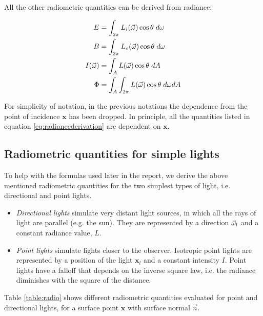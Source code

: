 All the other radiometric quantities can be derived from radiance:

\begin{equation}
\begin{split}
E &= \int_{2\pi} L_i(\vec{\omega}) \cos\theta \; d\omega \\
B &= \int_{2\pi} L_o(\vec{\omega}) \cos\theta \; d\omega \\
I(\vec{\omega}) &= \int_A L(\vec{\omega}) \cos\theta \; dA \\
\Phi &= \int_A \int_{2\pi} L(\vec{\omega}) \cos\theta \; d\omega dA
\end{split}
\label{eq:radiancederivation} 
\end{equation}

For simplicity of notation, in the previous notations the dependence from the point of incidence $\mathbf{x}$ has been dropped. In principle, all the quantities listed in equation \ref{eq:radiancederivation} are dependent on $\mathbf{x}$.

\subsection{Radiometric quantities for simple lights}

To help with the formulas used later in the report, we derive the above mentioned radiometric quantities for the two simplest types of light, i.e. directional and point lights.
\begin{itemize}
	\item \textit{Directional lights} simulate very distant light sources, in which all the rays of light are parallel (e.g. the sun). They are represented by a direction $\vec{\omega}_l$ and a constant radiance value, $L$. 
	\item \textit{Point lights} simulate lights closer to the observer. Isotropic point lights are represented by a position of the light $\mathbf{x}_l$ and a constant intensity $I$. Point lights have a falloff that depends on the inverse square law, i.e. the radiance diminishes with the square of the distance.
\end{itemize}

Table \ref{table:radio} shows different radiometric quantities evaluated for point and directional lights, for a surface point $\mathbf{x}$ with surface normal $\vec{n}$. 


